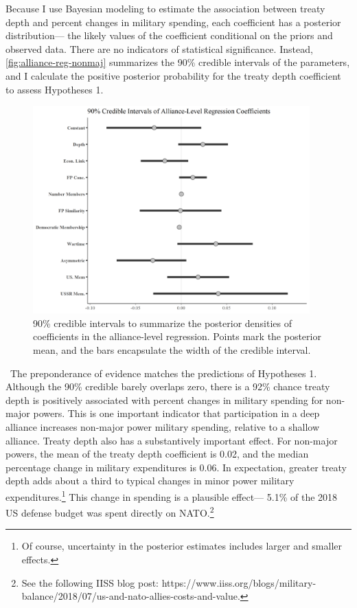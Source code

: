 \documentclass[12pt]{article}
\begin{document}
Because I use Bayesian modeling to estimate the association between treaty depth and percent changes in military spending, each coefficient has a posterior distribution--- the likely values of the coefficient conditional on the priors and observed data.
There are no indicators of statistical significance. 
Instead, \autoref{fig:alliance-reg-nonmaj} summarizes the 90\% credible intervals of the parameters, and I calculate the positive posterior probability for the treaty depth coefficient to assess Hypotheses 1.


\begin{figure}[htbp]
	\centering
		\includegraphics[width=0.95\textwidth]{../figures/alliance-reg-nonmaj.png}
	\caption{90\% credible intervals to summarize the posterior densities of coefficients in the alliance-level regression. Points mark the posterior mean, and the bars encapsulate the width of the credible interval.}
	\label{fig:alliance-reg-nonmaj}
\end{figure}


\
The preponderance of evidence matches the predictions of Hypotheses 1. 
Although the 90\% credible barely overlaps zero, there is a 92\% chance treaty depth is positively associated with percent changes in military spending for non-major powers.
This is one important indicator that participation in a deep alliance increases non-major power military spending, relative to a shallow alliance. 
Treaty depth also has a substantively important effect. 
For non-major powers, the mean of the treaty depth coefficient is 0.02, and the median percentage change in military expenditures is 0.06. 
In expectation, greater treaty depth adds about a third to typical changes in minor power military expenditures.\footnote{Of course, uncertainty in the posterior estimates includes larger and smaller effects.}
This change in spending is a plausible effect--- 5.1\% of the 2018 US defense budget was spent directly on NATO.\footnote{See the following IISS blog post: https://www.iiss.org/blogs/military-balance/2018/07/us-and-nato-allies-costs-and-value.} 
\end{document}

